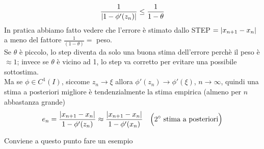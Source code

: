 \documentclass[12pt]{article}
\DeclarePairedDelimiter{\abs}{\lvert}{\rvert}
\begin{document}
\begin{enumerate}
    \[ \frac{1}{\abs{1-\phi'(z_n)}} \le \frac{1}{1-\theta} \]
    In pratica abbiamo fatto vedere che l'errore è stimato dallo STEP $= \abs{x_{n+1}-x_n}$ a meno del fattore $\frac{1}{(1-\theta)}=$ peso.\\
    Se $\theta$ è piccolo, lo step diventa da solo una buona stima dell'errore perchè il peso è $\approx 1$; invece se $\theta$ è vicino ad 1, lo step va corretto per evitare una possibile sottostima.\\
    Ma se $\phi \in C^1(I)$, siccome $z_n \to \xi$ allora $\phi'(z_n) \to \phi'(\xi)$, $n \to \infty$, quindi una stima a posteriori migliore è tendenzialmente la stima empirica (almeno per $n$ abbastanza grande)
    \[e_n = \frac{\abs{x_{n+1}-x_n}}{1-\phi'(z_n)} \approx \frac{\abs{x_{n+1}-x_n}}{1-\phi'(x_n)} \quad \Bigl( 2^\circ \text{ stima a posteriori}\Bigr)\]
\end{enumerate}
Conviene a questo punto fare un esempio
\end{document}
